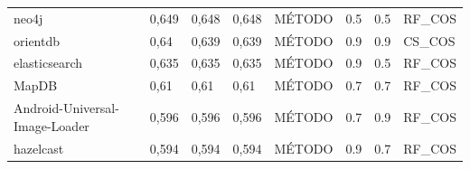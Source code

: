 \begin{table}[H]
{\begin{tabular}{llllllll}
neo4j                          & 0,649              & 0,648           & 0,648             & MÉTODO         & 0.5           & 0.5        & RF\_COS                 \\
orientdb                       & 0,64               & 0,639           & 0,639             & MÉTODO         & 0.9           & 0.9        & CS\_COS                 \\
elasticsearch                  & 0,635              & 0,635           & 0,635             & MÉTODO         & 0.9           & 0.5        & RF\_COS                 \\
MapDB                          & 0,61               & 0,61            & 0,61              & MÉTODO         & 0.7           & 0.7        & RF\_COS                 \\
Android-Universal-Image-Loader & 0,596              & 0,596           & 0,596             & MÉTODO         & 0.7           & 0.9        & RF\_COS                 \\
hazelcast                      & 0,594              & 0,594           & 0,594             & MÉTODO         & 0.9           & 0.7        & RF\_COS                
\end{tabular}
}
\end{table}
